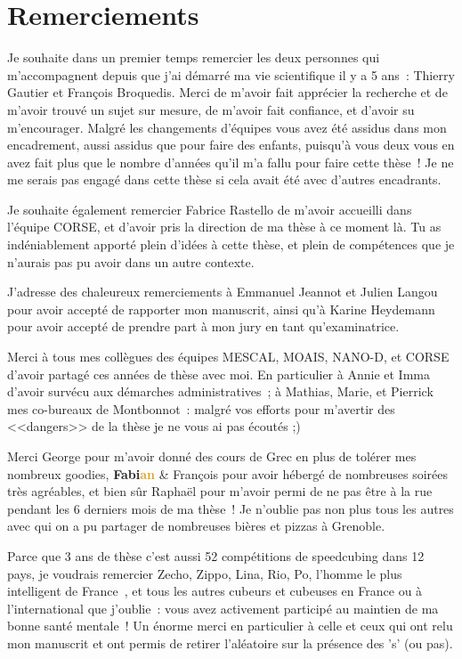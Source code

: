 \chapter*{Remerciements}

Je souhaite dans un premier temps remercier les deux personnes qui m'accompagnent depuis que j'ai démarré ma vie scientifique il y a 5 ans~: Thierry Gautier et François Broquedis.
Merci de m'avoir fait apprécier la recherche et de m'avoir trouvé un sujet sur mesure, de m'avoir fait confiance, et d'avoir su m'encourager.
Malgré les changements d'équipes vous avez été assidus dans mon encadrement, aussi assidus que pour faire des enfants, puisqu'à vous deux vous en avez fait plus que le nombre d'années qu'il m'a fallu pour faire cette thèse~!
Je ne me serais pas engagé dans cette thèse si cela avait été avec d'autres encadrants.

Je souhaite également remercier Fabrice Rastello de m'avoir accueilli dans l'équipe CORSE, et d'avoir pris la direction de ma thèse à ce moment là.
Tu as indéniablement apporté plein d'idées à cette thèse, et plein de compétences que je n'aurais pas pu avoir dans un autre contexte.

J'adresse des chaleureux remerciements à Emmanuel Jeannot et Julien Langou  pour avoir accepté de rapporter mon manuscrit, ainsi qu'à Karine Heydemann pour avoir accepté de prendre part à mon jury en tant qu'examinatrice.

Merci à tous mes collègues des équipes MESCAL, MOAIS, NANO-D, et CORSE d'avoir partagé ces années de thèse avec moi.
En particulier à Annie et Imma d'avoir survécu aux démarches administratives~; à Mathias, Marie, et Pierrick mes co-bureaux de Montbonnot~: malgré vos efforts pour m'avertir des <<dangers>> de la thèse je ne vous ai pas écoutés ;)

Merci
George pour m'avoir donné des cours de Grec en plus de tolérer mes nombreux goodies, \textbf{Fa\textcolor{BrickRed}{bi}\textcolor{Goldenrod}{an}} \& François pour avoir hébergé de nombreuses soirées très agréables, et bien sûr Raphaël pour m'avoir permi de ne pas être à la rue pendant les 6 derniers mois de ma thèse~! Je n'oublie pas non plus tous les autres avec qui on a pu partager de nombreuses bières et pizzas à Grenoble.

Parce que 3 ans de thèse c'est aussi 52 compétitions de speedcubing dans 12 pays, je voudrais remercier Zecho, Zippo, Lina, Rio, Po, l'homme le plus intelligent de France~\cite{TF1}, et tous les autres cubeurs et cubeuses en France ou à l'international que j'oublie~: vous avez activement participé au maintien de ma bonne santé mentale~!
Un énorme merci en particulier à celle et ceux qui ont relu mon manuscrit et ont permis de retirer l'aléatoire sur la présence des 's' (ou pas).

